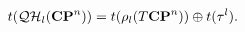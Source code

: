 \begin{equation}
t({\cal QH}_l({\bf CP}^n))=t(\rho_l(T{\bf CP}^n))\oplus t({\tau^l}).
\label{decc}
\end{equation}

